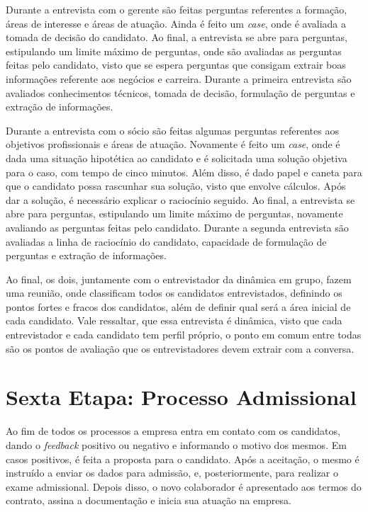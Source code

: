 Durante a entrevista com o gerente são feitas perguntas referentes a formação, áreas de interesse e áreas de atuação. Ainda é feito um \textit{case}, onde é avaliada a tomada de decisão do candidato.
Ao final, a entrevista se abre para perguntas, estipulando um limite máximo de perguntas, onde são avaliadas as perguntas feitas pelo candidato, visto que se espera perguntas que consigam extrair boas informações referente aos negócios e carreira.
Durante a primeira entrevista são avaliados conhecimentos técnicos, tomada de decisão, formulação de perguntas e extração de informações.
    



Durante a entrevista com o sócio são feitas algumas perguntas referentes aos objetivos profissionais e áreas de atuação. Novamente é feito um \textit{case}, onde é dada uma situação hipotética ao candidato e é solicitada uma solução objetiva para o caso, com tempo de cinco minutos. Além disso, é dado papel e caneta para que o candidato possa rascunhar sua solução, visto que envolve cálculos. Após dar a solução, é necessário explicar o raciocínio seguido.
Ao final, a entrevista se abre para perguntas, estipulando um limite máximo de perguntas, novamente avaliando as perguntas feitas pelo candidato.
Durante a segunda entrevista são avaliadas a linha de raciocínio do candidato, capacidade de formulação de perguntas e extração de informações.


Ao final, os dois, juntamente com o entrevistador da dinâmica em grupo, fazem uma reunião, onde classificam todos os candidatos entrevistados, definindo os pontos fortes e fracos dos candidatos, além de definir qual será a área inicial de cada candidato.
Vale ressaltar, que essa entrevista é dinâmica, visto que cada entrevistador e cada candidato tem perfil próprio, o ponto em comum entre todas são os pontos de avaliação que os entrevistadores devem extrair com a conversa.


\section{Sexta Etapa: Processo Admissional}

Ao fim de todos os processos a empresa entra em contato com os candidatos, dando o \textit{feedback} positivo ou negativo e informando o motivo dos mesmos. Em casos positivos, é feita a proposta para o candidato. Após a aceitação, o mesmo é instruído a enviar os dados para admissão, e, posteriormente, para realizar o exame admissional. Depois disso, o novo colaborador é apresentado aos termos do contrato, assina a documentação e inicia sua atuação na empresa.





